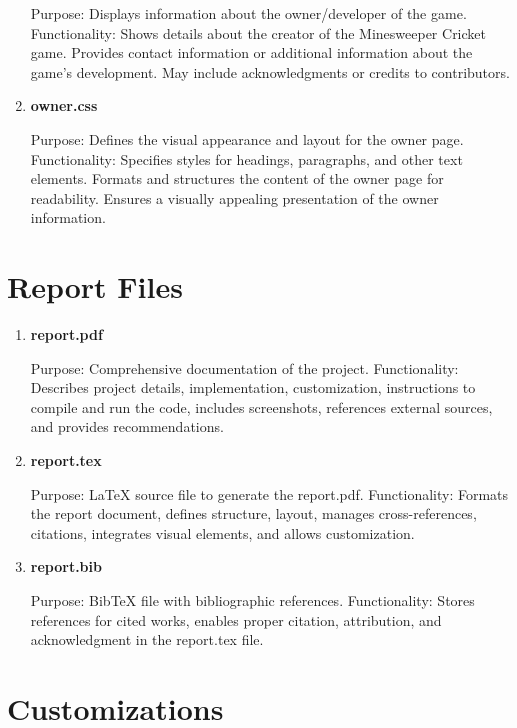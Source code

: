 \documentclass{article}
\begin{document}
\begin{enumerate}
  Purpose: Displays information about the owner/developer of the game.
  Functionality:
  Shows details about the creator of the Minesweeper Cricket game.
  Provides contact information or additional information about the game's development.
  May include acknowledgments or credits to contributors.

  \item \textbf{owner.css}

  Purpose: Defines the visual appearance and layout for the owner page.
  Functionality:
  Specifies styles for headings, paragraphs, and other text elements.
  Formats and structures the content of the owner page for readability.
  Ensures a visually appealing presentation of the owner information.

\end{enumerate}

\section*{Report Files}

\begin{enumerate}
  \item \textbf{report.pdf}
  
  Purpose: Comprehensive documentation of the project.
  Functionality: Describes project details, implementation, customization, instructions to compile and run the code, includes screenshots, references external sources, and provides recommendations.

  \item \textbf{report.tex}

  Purpose: LaTeX source file to generate the report.pdf.
  Functionality: Formats the report document, defines structure, layout, manages cross-references, citations, integrates visual elements, and allows customization.

  \item \textbf{report.bib}

  Purpose: BibTeX file with bibliographic references.
  Functionality: Stores references for cited works, enables proper citation, attribution, and acknowledgment in the report.tex file.
\end{enumerate}

\section*{Customizations}
\end{document}
